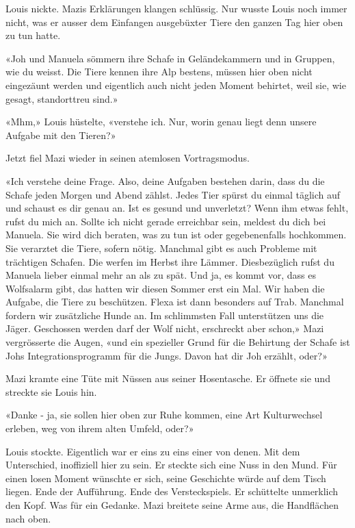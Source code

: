 Louis nickte. Mazis Erklärungen klangen schlüssig. Nur wusste Louis noch
immer nicht, was er ausser dem Einfangen ausgebüxter Tiere den ganzen
Tag hier oben zu tun hatte.

«Joh und Manuela sömmern ihre Schafe in Geländekammern und in Gruppen,
wie du weisst. Die Tiere kennen ihre Alp bestens, müssen hier oben nicht
eingezäunt werden und eigentlich auch nicht jeden Moment behirtet, weil
sie, wie gesagt, standorttreu sind.»

«Mhm,» Louis hüstelte, «verstehe ich. Nur, worin genau liegt denn unsere
Aufgabe mit den Tieren?»

Jetzt fiel Mazi wieder in seinen atemlosen Vortragsmodus.

«Ich verstehe deine Frage. Also, deine Aufgaben bestehen darin, dass du
die Schafe jeden Morgen und Abend zählst. Jedes Tier spürst du einmal
täglich auf und schaust es dir genau an. Ist es gesund und unverletzt?
Wenn ihm etwas fehlt, rufst du mich an. Sollte ich nicht gerade
erreichbar sein, meldest du dich bei Manuela. Sie wird dich beraten, was
zu tun ist oder gegebenenfalls hochkommen. Sie verarztet die Tiere,
sofern nötig. Manchmal gibt es auch Probleme mit trächtigen Schafen. Die
werfen im Herbst ihre Lämmer. Diesbezüglich rufst du Manuela lieber
einmal mehr an als zu spät.
Und ja, es kommt vor, dass es Wolfsalarm gibt, das hatten wir diesen
Sommer erst ein Mal. Wir haben die Aufgabe, die Tiere zu beschützen.
Flexa ist dann besonders auf Trab. Manchmal fordern wir zusätzliche
Hunde an. Im schlimmsten Fall unterstützen uns die Jäger. Geschossen
werden darf der Wolf nicht, erschreckt aber schon,» Mazi vergrösserte
die Augen, «und ein spezieller Grund für die Behirtung der Schafe ist
Johs Integrationsprogramm für die Jungs. Davon hat dir Joh erzählt,
oder?»

Mazi kramte eine Tüte mit Nüssen aus seiner Hosentasche. Er öffnete sie und streckte sie Louis hin. 

«Danke - ja, sie sollen hier oben zur Ruhe
kommen, eine Art Kulturwechsel erleben, weg von ihrem alten Umfeld, oder?»

Louis stockte. Eigentlich war er eins zu eins einer von denen. Mit
dem Unterschied, inoffiziell hier zu sein. Er steckte sich eine Nuss in den Mund. 
Für einen losen Moment wünschte er sich, seine Geschichte würde
auf dem Tisch liegen. Ende der Aufführung. Ende des Versteckspiels. 
Er schüttelte unmerklich den Kopf. Was für ein Gedanke.
Mazi breitete seine Arme aus, die Handflächen nach oben.

